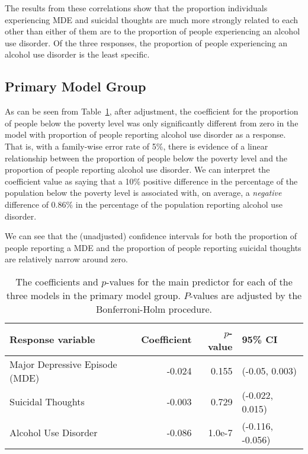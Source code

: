 \documentclass{article}
\begin{document}
The results from these correlations show that the proportion individuals
experiencing MDE and suicidal thoughts are much more strongly related to each
other than either of them are to the proportion of people experiencing
an alcohol use disorder.
Of the three responses, the proportion of people experiencing an
alcohol use disorder is the least specific.


\subsection{Primary Model Group}

As can be seen from Table~\ref{tab:primary-model-results},
after adjustment,
the coefficient for the proportion of people below the poverty level
was only significantly different from zero
in the model with proportion of people reporting
alcohol use disorder as a response.
That is, with a family-wise error rate of 5\%,
there is evidence of a linear relationship between
the proportion of people below the poverty level
and the proportion of people reporting alcohol use disorder.
We can interpret the coefficient value as saying that
a 10\% positive difference in the percentage of the
population below the poverty level
is associated with, on average,
a \textit{negative} difference of 0.86\%
in the percentage of the population
reporting alcohol use disorder.

We can see that the (unadjusted) confidence intervals for both
the proportion of people reporting a MDE
and the proportion of people reporting suicidal thoughts
are relatively narrow around zero.

\begin{table}[t]
\begin{center}
    \begin{tabular}{lrrl}
        \toprule
        Response variable & Coefficient & $p$-value & 95\% CI\\
        \midrule
        Major Depressive Episode (MDE) & -0.024 & 0.155 & (-0.05, 0.003)\\
        Suicidal Thoughts & -0.003 & 0.729 & (-0.022, 0.015)\\
        Alcohol Use Disorder & -0.086 & 1.0e-7 & (-0.116, -0.056)\\
        \bottomrule
    \end{tabular}
\caption{\label{tab:primary-model-results} The coefficients and $p$-values
    for the main predictor for each of the three models
    in the primary model group.
    $P$-values are adjusted by the Bonferroni-Holm procedure.
}
\end{center}
\end{table}
\end{document}
